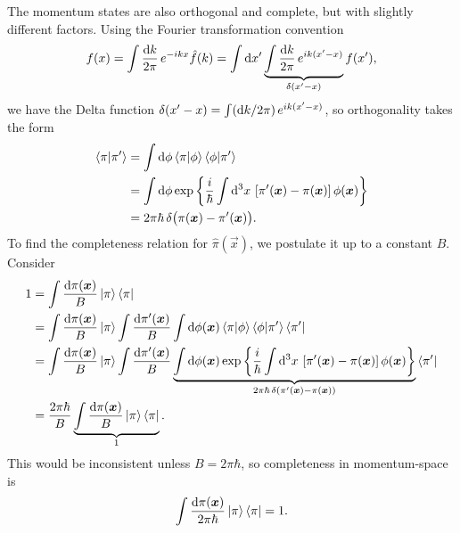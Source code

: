 The momentum states are also orthogonal and complete, but with slightly different factors.
Using the Fourier transformation convention
\begin{equation}
	f(x) = \int \frac{\mathop{}\!\mathrm{d} k}{2 \pi} \, e^{-i k x} \hat{f}(k)
	     = \int \mathop{}\!\mathrm{d} x' \underbrace{\int \frac{\mathop{}\!\mathrm{d} k}{2 \pi} \, e^{i k (x'-x)}}_{\delta(x'-x)} f(x') ,
\end{equation}
we have the Delta function $\delta(x'-x) = \int (\mathop{}\!\mathrm{d} k / 2 \pi) \, e^{i k (x'-x)}$, so orthogonality takes the form
\begin{equation}
\begin{split}
	\braket{\pi | \pi'} &= \int \mathop{}\!\mathrm{d} \phi \braket{\pi | \phi} \braket{\phi | \pi'} \\
	                       &= \int \mathop{}\!\mathrm{d} \phi \exp \left\{ \frac{i}{\hbar} \int \mathop{}\!\mathrm{d}^3 x \, \left[ \pi'({\bm{x}}) - \pi({\bm{x}}) \right] \phi({\bm{x}}) \right\} \\
	                       &= 2 \pi \hbar \, \delta \big( \pi({\bm{x}}) - \pi'({\bm{x}}) \big) .
\end{split}
\end{equation}
To find the completeness relation for $\hat\pi(\vec{x})$, we postulate it up to a constant $B$.
Consider
\begin{equation}
\begin{split}
	1 &= \int \frac{\dif \pi(\vec{x})}{B} \ket{\pi} \bra{\pi} \\
	  &= \int \frac{\dif \pi(\vec{x})}{B} \ket{\pi} \int \frac{\dif \pi'(\vec{x})}{B} \int \dif \phi(\vec{x}) \braket{\pi | \phi} \braket{\phi | \pi'} \bra{\pi'} \\
	  &= \int \frac{\dif \pi(\vec{x})}{B} \ket{\pi} \int \frac{\dif \pi'(\vec{x})}{B} \underbrace{\int \dif \phi(\vec{x}) \exp \left\{ \frac{i}{\hbar} \int \dif^3 x \, \left[ \pi'(\vec{x}) - \pi(\vec{x}) \right] \phi(\vec{x}) \right\}}_{2 \pi \hbar \, \delta \left( \pi'(\vec{x}) - \pi(\vec{x}) \right)} \bra{\pi'} \\
	  &= \frac{2 \pi \hbar}{B} \underbrace{\int \frac{\dif \pi(\vec{x})}{B} \ket{\pi} \bra{\pi}}_{1} .
\end{split}
\end{equation}
This would be inconsistent unless $B = 2 \pi \hbar$, so completeness in momentum-space is
\begin{equation}
	\int \frac{\mathop{}\!\mathrm{d} \pi({\bm{x}})}{2 \pi \hbar} \ket{\pi} \bra{\pi} = 1 .
\end{equation}

